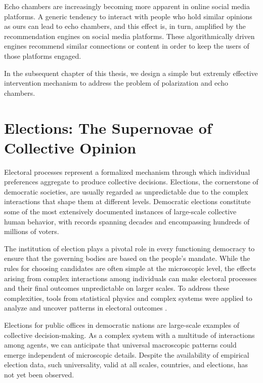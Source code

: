 Echo chambers are increasingly becoming more apparent in online social media platforms. A generic tendency to interact with people who hold similar opinions as ours can lead to echo chambers, and this effect is, in turn, amplified by the recommendation engines on social media platforms. These algorithmically driven engines recommend similar connections or content in order to keep the users of those platforms engaged.

In the subsequent chapter of this thesis, we design a simple but extremly effective intervention mechanism to address the problem of polarization and echo chambers.

\section{Elections: The Supernovae of Collective Opinion}
Electoral processes represent a formalized mechanism through which individual preferences aggregate to produce collective decisions. Elections, the cornerstone of democratic societies, are usually regarded as unpredictable due to the complex interactions that shape them at different levels. Democratic elections constitute some of the most extensively documented instances of large-scale collective human behavior, with records spanning decades and encompassing hundreds of millions of voters.

The institution of election plays a pivotal role in every functioning democracy to ensure that the governing bodies are based on the people's mandate. While the rules for choosing candidates are often simple at the microscopic level, the effects arising from complex interactions among individuals can make electoral processes and their final outcomes unpredictable on larger scales. To address these complexities, tools from statistical physics and complex systems were applied to analyze and uncover patterns in electoral outcomes \cite{galam1999application, gelman2002mathematics, brams2008, CasForLor2009, galam2012, ForMacRed2013, SenCha2014, FerSucRam2014, BraDeA2017, Kon2019, redner2019reality, MigTor2020}.

Elections for public offices in democratic nations are large-scale examples of collective decision-making. As a complex system with a multitude of interactions among agents, we can anticipate that universal macroscopic patterns could emerge independent of microscopic details. Despite the availability of empirical election data, such universality, valid at all scales, countries, and elections, has not yet been observed.

